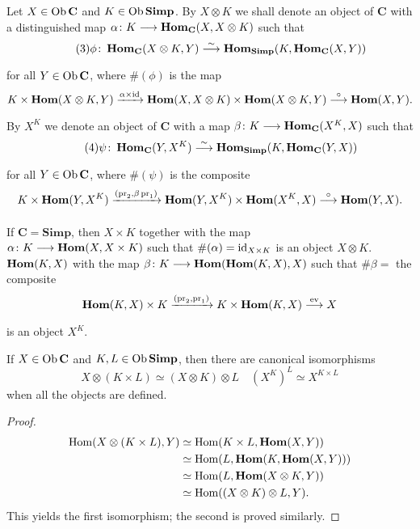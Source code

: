 \documentclass[../main]{subfiles}
\begin{document}
\begin{definition}\label{def:2.1.3}
Let $X \in \operatorname{Ob} \mathbf C$ and $K \in \operatorname{Ob} \mathbf{Simp}$. By $X \otimes K$ we shall denote an object of $\mathbf C$ with a distinguished map $\alpha \colon K \longrightarrow \operatorname{\mathbf{Hom}}_{\mathbf C}(X, X \otimes K)$ such that
\begin{equation}\tag{3}
\label{eq:2.1.03}
    \phi \colon \UHom_{\mathbf C} (X \otimes K, Y) \varrightarrow{\sim} \UHom_{\mathbf{Simp}}(K, \UHom_{\mathbf C}(X, Y))
\end{equation}
for all $Y \in \operatorname{Ob} \mathbf C$, where $\#(\phi)$ is the map 
\[
    K \times \UHom (X \otimes K, Y) \varrightarrow{\alpha \times \id} \UHom(X, X \otimes K) \times \UHom(X \otimes K, Y) \varrightarrow \circ \UHom(X,Y).
\]
By $X^K$ we denote an object of $\mathbf C$ with a map $\beta \colon K \longrightarrow \operatorname{\mathbf{Hom}}_{\mathbf C}(X^K, X)$ such that 
\begin{equation}\tag{4}
\label{eq:2.1.04}
    \psi \colon \UHom_{\mathbf C}(Y, X^K) \varrightarrow \sim \UHom_{\mathbf{Simp}}(K, \UHom_{\mathbf C}(Y,X))
\end{equation}
for all $Y \in \operatorname{Ob} \mathbf C$, where $\#(\psi)$ is the composite
\[
    K \times \UHom(Y, X^K) \varrightarrow{(\pr_2, \beta \pr_1)} \UHom(Y, X^K) \times \UHom(X^K, X) \varrightarrow \circ \UHom(Y,X).
\]
\end{definition}

\begin{example*}
If $\mathbf C = \mathbf{Simp}$, then $X \times K$ together with the map \\$\alpha \colon K \longrightarrow \operatorname{\mathbf{Hom}}(X, X\times K)$ such that $\#(\alpha) = \operatorname{id}_{X \times K}$ is an object $X \otimes K$. $\operatorname{\mathbf{Hom}}(K, X)$ with the map $\beta \colon K \longrightarrow \operatorname{\mathbf{Hom}}(\operatorname{\mathbf{Hom}}(K,X), X)$ such that $\#\beta = $ the composite 
\[
    \UHom(K, X) \times K \varrightarrow{(\pr_2, \pr_1)} K \times \UHom(K, X) \varrightarrow{\ev} X
\]
is an object $X^K$.
\end{example*}

\begin{proposition}
\label{prop:2.1.01}
If $X \in \operatorname{Ob} \mathbf C$ and $K, L \in \operatorname{Ob} \mathbf{Simp}$, then there are canonical isomorphisms 
\begin{equation}
\label{eq:2.1.05}\tag{5}
    X \otimes (K \times L) \simeq (X \otimes K) \otimes L
    \quad
    (X^K)^L \simeq X^{K \times L}
\end{equation}
when all the objects are defined.
\end{proposition}
\begin{proof}
\begin{align*}
    \operatorname{Hom}(X \otimes (K \times L), Y) 
    &\simeq \operatorname{Hom}(K \times L, \operatorname{\mathbf{Hom}}(X, Y))
    \\&\simeq \operatorname{Hom}(L, \operatorname{\mathbf{Hom}}(K, \operatorname{\mathbf{Hom}}(X, Y)))
    \\&\simeq \operatorname{Hom}(L, \operatorname{\mathbf{Hom}}(X \otimes K, Y)) 
    \\&\simeq \operatorname{Hom}((X \otimes K) \otimes L, Y).
\end{align*}
This yields the first isomorphism; the second is proved similarly.
\end{proof}
\end{document}
